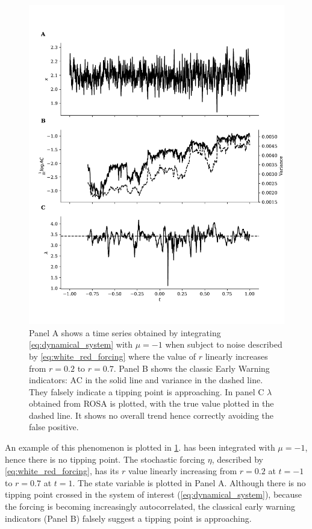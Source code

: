 \begin{figure}
\includegraphics[width=\textwidth,keepaspectratio]{figure2}
\caption[Early Warning Signal False Positive]{Panel A shows a time series obtained by integrating  \cref{eq:dynamical_system} with $\mu = -1$ when subject to
  noise described by \cref{eq:white_red_forcing} where the
  value of $r$ linearly increases from $r=0.2$ to $r=0.7$. Panel B 
  shows the classic Early Warning indicators: AC in the solid
  line and variance in the dashed line. They falsely indicate a
  tipping point is approaching. In panel C $\lambda$ obtained
  from ROSA is plotted, with the true value plotted in the dashed line. It shows
  no overall trend hence correctly avoiding the false positive.}\label{fig:changing_forcing}
\end{figure}


An example of this phenomenon is plotted in
\cref{fig:changing_forcing}.  
 has been integrated with $\mu = -1$, hence there is no 
tipping point. The stochastic forcing $\eta$, described by \cref{eq:white_red_forcing}, has its $r$ value
linearly increasing
from $r=0.2$ at $t=-1$ to $r=0.7$ at $t=1$. The state
variable is plotted in Panel A. Although there is no
tipping point crossed in the system of interest (\cref{eq:dynamical_system}), because the forcing is becoming 
increasingly autocorrelated, the classical early warning indicators 
(Panel B) falsely suggest a tipping point is approaching.

